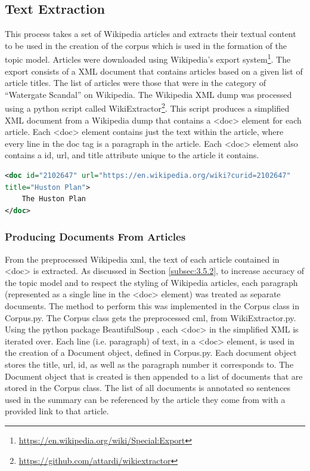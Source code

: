 \subsection{Text Extraction}
This process takes a set of Wikipedia articles and extracts their textual content to be used in the creation of the corpus which is used in the formation of the topic model. Articles were downloaded using Wikipedia’s export system\footnote{\url{https://en.wikipedia.org/wiki/Special:Export}}. The export consists of a XML document that contains articles based on a given list of article titles. The list of articles were those that were in the category of “Watergate Scandal” on Wikipedia. The Wikipedia XML dump was processed using a python script called WikiExtractor\footnote{\url{https://github.com/attardi/wikiextractor}}. This script produces a simplified XML document from a Wikipedia dump that contains a <doc> element for each article. Each <doc> element contains just the text within the article, where every line in the doc tag is a paragraph in the article. Each <doc> element also contains a id, url, and title attribute unique to the article it contains. 

\begin{lstlisting}[language=XML]
<doc id="2102647" url="https://en.wikipedia.org/wiki?curid=2102647" 
title="Huston Plan">
    The Huston Plan
</doc>
\end{lstlisting}

\subsubsection{Producing Documents From Articles}
From the preprocessed Wikipedia xml, the text of each article contained in <doc> is extracted. As discussed in Section \ref{subsec:3.5.2}, to increase accuracy of the topic model and to respect the styling of Wikipedia articles, each paragraph (represented as a single line in the <doc> element) was treated as separate documents. The method to perform this was implemented in the Corpus class in Corpus.py. The Corpus class gets the preprocessed cml, from WikiExtractor.py. Using the python package BeautifulSoup \citep{richardson2007beautiful}, each <doc> in the simplified XML is iterated over. Each line (i.e. paragraph) of text, in a <doc> element, is used in the creation of a Document object, defined in Corpus.py. Each document object stores the title, url, id, as well as the paragraph number it corresponds to. The Document object that is created is then appended to a list of documents that are stored in the Corpus class. The list of all documents is annotated so sentences used in the summary can be referenced by the article they come from with a provided link to that article.

